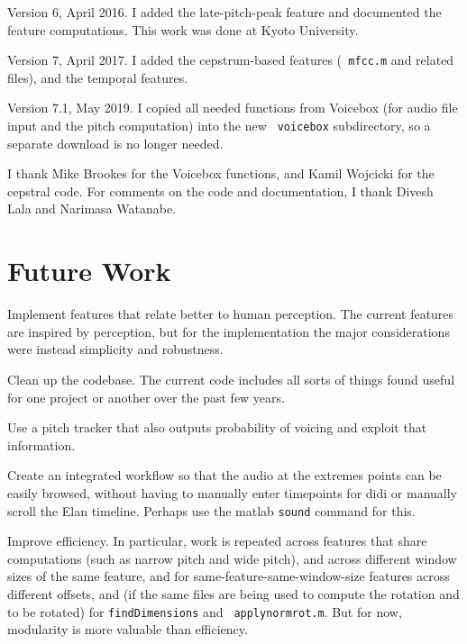 \documentclass[11pt]{article}
\begin{document}
Version 6, April 2016.  I added the late-pitch-peak feature and
documented the feature computations.  This work was done at Kyoto
University.

Version 7, April 2017.  I added the cepstrum-based features ({\tt
  mfcc.m} and related files), and the temporal features.

Version 7.1, May 2019.  I copied all needed functions from Voicebox
(for audio file input and the pitch computation) into the new {\tt
  voicebox} subdirectory, so a separate download is no longer needed.

I thank Mike Brookes for the Voicebox functions, and Kamil Wojcicki
for the cepstral code.  For comments on the code and documentation, I
thank Divesh Lala and Narimasa Watanabe.

\section{Future Work}

Implement features that relate better to human perception.  The
current features are inspired by perception, but for the
implementation the major considerations were instead simplicity and
robustness.

Clean up the codebase.  The current code includes
all sorts of things found useful for one project or another over the past
few years.

Use a pitch tracker that also outputs probability
of voicing and exploit that information.

Create an integrated workflow so that the audio at the extremes points
can be easily browsed, without having to manually enter timepoints for
didi or manually scroll the Elan timeline.  Perhaps use the matlab
{\tt sound} command for this.

Improve efficiency.  In particular,
work is repeated across features that share computations (such as
narrow pitch and wide pitch), and across different window sizes of the
same feature, and for same-feature-same-window-size features across
different offsets, and (if the same files are being used to compute
the rotation and to be rotated) for {\tt findDimensions} and {\tt
  applynormrot.m}.  But for now, modularity is more valuable than
efficiency.


%
\end{document}
